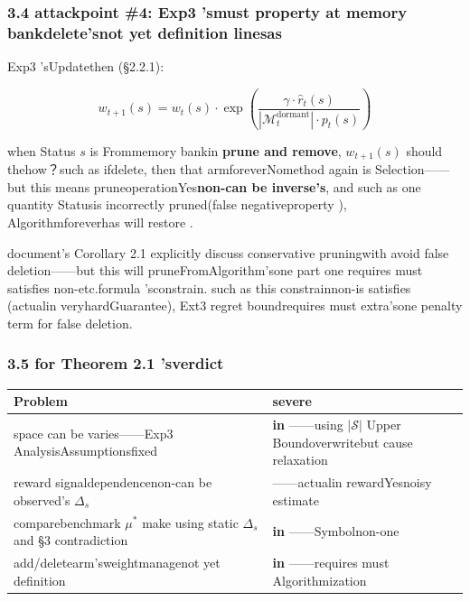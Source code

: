 \documentclass[
  12pt,
]{article}
\begin{document}
\subsubsection{3.4 attackpoint  \#4: Exp3
'smust property at memory bankdelete'snot yet definition linesas }\label{ux653bux51fbux70b9-4exp3-ux7684ux91cdux8981ux6027ux52a0ux6743ux5728ux8bb0ux5fc6ux5e93ux5220ux9664ux65f6ux7684ux672aux5b9aux4e49ux884cux4e3a}

Exp3 'sUpdatethen (§2.2.1):

\[w_{t+1}(s) = w_t(s) \cdot \exp\left(\frac{\gamma \cdot \hat{r}_t(s)}{|\mathcal{M}_t^{\text{dormant}}| \cdot p_t(s)}\right)\]

when Status \(s\) is Frommemory bankin \textbf{prune and remove}, \(w_{t+1}(s)\)
should thehow？such as ifdelete, then that armforeverNomethod again is Selection------but this means pruneoperationYes\textbf{non-can be inverse's}, and such as one quantity Statusis incorrectly pruned(false negativeproperty ), Algorithmforeverhas will restore . 

document's Corollary 2.1
explicitly discuss conservative pruningwith avoid false deletion------but this will pruneFromAlgorithm'sone part one requires must satisfies non-etc.formula 'sconstrain. such as this constrainnon-is satisfies (actualin veryhardGuarantee), Ext3
regret boundrequires must extra'sone penalty term for false deletion. 

\subsubsection{3.5 for  Theorem 2.1
'sverdict}\label{ux5bf9-theorem-2.1-ux7684ux5224ux51b3}

\begin{longtable}[]{@{}
  >{\raggedright\arraybackslash}p{}
  >{\raggedright\arraybackslash}p{}@{}}
\toprule\noalign{}
\begin{minipage}[b]{\linewidth}\raggedright
Problem
\end{minipage} & \begin{minipage}[b]{\linewidth}\raggedright
severe
\end{minipage} \\
\midrule\noalign{}
\endhead
\bottomrule\noalign{}
\endlastfoot
space can be varies------Exp3 AnalysisAssumptionsfixed  & \textbf{in }------using 
\(|\mathcal{S}|\) Upper Boundoverwritebut cause relaxation \\
reward signaldependencenon-can be observed's \(\Delta_s\) &
\textbf{}------actualin rewardYesnoisy estimate \\
comparebenchmark \(\mu^*\) make using static  \(\Delta_s\) and  §3 contradiction &
\textbf{in }------Symbolnon-one  \\
add/deletearm'sweightmanagenot yet definition  & \textbf{in }------requires must Algorithmization  \\
\end{longtable}
\end{document}

